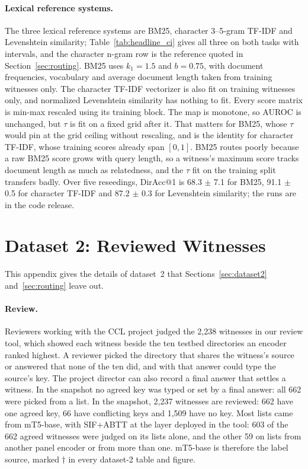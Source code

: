 \documentclass[11pt]{article}
\begin{document}
\paragraph{Lexical reference systems.} The three lexical reference systems are BM25, character 3--5-gram TF-IDF and Levenshtein similarity; Table~\ref{tab:headline_ci} gives all three on both tasks with intervals, and the character n-gram row is the reference quoted in Section~\ref{sec:routing}.
BM25 uses $k_1=1.5$ and $b=0.75$, with document frequencies, vocabulary and average document length taken from training witnesses only.
The character TF-IDF vectorizer is also fit on training witnesses only, and normalized Levenshtein similarity has nothing to fit.
Every score matrix is min-max rescaled using its training block.
The map is monotone, so AUROC is unchanged, but $\tau$ is fit on a fixed grid after it.
That matters for BM25, whose $\tau$ would pin at the grid ceiling without rescaling, and is the identity for character TF-IDF, whose training scores already span $[0, 1]$.
BM25 routes poorly because a raw BM25 score grows with query length, so a witness's maximum score tracks document length as much as relatedness, and the $\tau$ fit on the training split transfers badly.
Over five reseedings, DirAcc@1 is 68.3 $\pm$ 7.1 for BM25, 91.1 $\pm$ 0.5 for character TF-IDF and 87.2 $\pm$ 0.3 for Levenshtein similarity; the runs are in the code release.

\FloatBarrier
\section{Dataset 2: Reviewed Witnesses}
\label{app:dataset2}

This appendix gives the details of dataset~2 that Sections~\ref{sec:dataset2} and~\ref{sec:routing} leave out.

\paragraph{Review.}
Reviewers working with the CCL project judged the 2,238 witnesses in our review tool, which showed each witness beside the ten testbed directories an encoder ranked highest.
A reviewer picked the directory that shares the witness's source or answered that none of the ten did, and with that answer could type the source's key.
The project director can also record a final answer that settles a witness.
In the snapshot no agreed key was typed or set by a final answer: all 662 were picked from a list.
In the snapshot, 2,237 witnesses are reviewed: 662 have one agreed key, 66 have conflicting keys and 1,509 have no key.
Most lists came from mT5-base, with SIF+ABTT at the layer deployed in the tool: 603 of the 662 agreed witnesses were judged on its lists alone, and the other 59 on lists from another panel encoder or from more than one.
mT5-base is therefore the label source, marked $\dagger$ in every dataset-2 table and figure.
\end{document}

